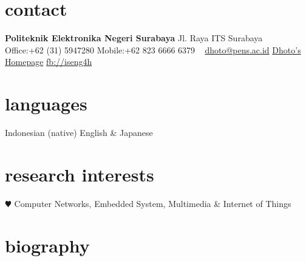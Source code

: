 \documentclass[style=verbose,maxnames=99,sorting=ydnt,backend=biber]{friggeri-cv} %
\begin{document}


\begin{aside} %
\section{contact}
\textbf{Politeknik Elektronika Negeri Surabaya}
Jl. Raya ITS Surabaya
~
Office:+62 (31) 5947280
Mobile:+62 823 6666 6379
~
\href{mailto:dhoto@pens.ac.id}{dhoto@pens.ac.id}
\href{http://dhoto.lecturer.pens.ac.id/}{Dhoto's Homepage}
\href{http://facebook.com/iseng4h}{fb://iseng4h}
\section{languages}
Indonesian (native)
English \& Japanese 
\section{research interests}
{\color{red} $\varheartsuit$} Computer Networks,
Embedded System, Multimedia \& Internet of Things
\end{aside}


\section{biography}
\end{document}
